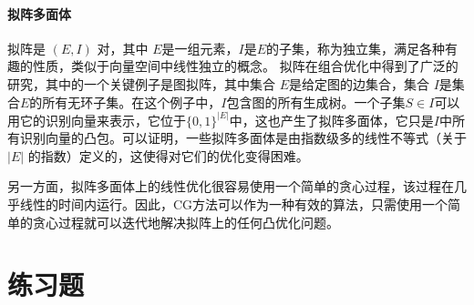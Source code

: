 \paragraph*{
    拟阵多面体
    }

拟阵是 $(E,I)$ 对，其中 $E$是一组元素，$I$是$E$的子集，称为独立集，满足各种有趣的性质，类似于向量空间中线性独立的概念。
拟阵在组合优化中得到了广泛的研究，其中的一个关键例子是图拟阵，其中集合 $E$是给定图的边集合，集合 $I$是集合$E$的所有无环子集。在这个例子中，$I$包含图的所有生成树。一个子集$S\in{I}$可以用它的识别向量来表示，它位于$\lbrace{0,1}\rbrace^{\vert{E}\vert}$中，这也产生了拟阵多面体，它只是$I$中所有识别向量的凸包。可以证明，一些拟阵多面体是由指数级多的线性不等式（关于$\vert{E}\vert$ 的指数）定义的，这使得对它们的优化变得困难。

另一方面，拟阵多面体上的线性优化很容易使用一个简单的贪心过程，该过程在几乎线性的时间内运行。因此，CG方法可以作为一种有效的算法，只需使用一个简单的贪心过程就可以迭代地解决拟阵上的任何凸优化问题。


\newpage
\section{
    练习题
    }

